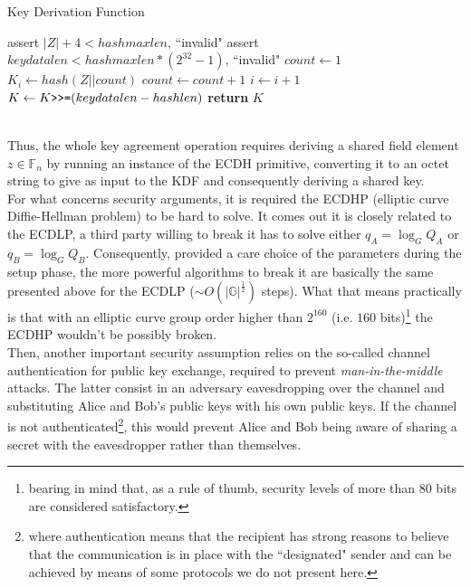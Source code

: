 \begin{algorithm}
	\caption{Key Derivation Function}
	\label{alg:KDF}
	\begin{algorithmic}[1]
		\State assert $|Z| + 4 < hashmaxlen $, ``invalid"
		\State assert $keydatalen < hashmaxlen * (2^{32} -1) $, ``invalid"
		\State $count \gets 1 $  
		\State $K_i \gets hash(Z||count)$
		\State $count \gets count + 1$
		\State $i \gets i + 1$
		\EndFor
		\State $K \gets K \verb|>>=| (keydatalen - hashlen)$ 
		\State \textbf{return} $K$ 
		\EndProcedure
	\end{algorithmic}
\end{algorithm}\\
Thus, the whole key agreement operation requires deriving a shared field element $z \in \mathbb{F}_n$ by running an instance of the ECDH primitive, converting it to an octet string to give as input to the KDF and consequently deriving a shared key.\\
For what concerns security arguments, it is required the ECDHP (elliptic curve Diffie-Hellman problem) to be hard to solve. It comes out it is closely related to the ECDLP, a third party willing to break it has to solve either $q_A = \log_G{Q_A}$ or $q_B = \log_G{Q_B}$. Consequently, provided a care choice of the parameters during the setup phase, the more powerful algorithms to break it are basically the same presented above for the ECDLP ($\sim O(|\mathbb{G}|^{\frac{1}{2}})$ steps). What that means practically is that with an elliptic curve group order higher than $2^{160}$ (i.e. $160$ bits)\footnote{bearing in mind that, as a rule of thumb, security levels of more than 80 bits are considered satisfactory.} the ECDHP wouldn't be possibly broken.\\ 
Then, another important security assumption relies on the so-called channel authentication for public key exchange, required to prevent \textit{man-in-the-middle} attacks. The latter consist in an adversary eavesdropping over the channel and substituting Alice and Bob's public keys with his own public keys. If the channel is not authenticated\footnote{where authentication means that the recipient has strong reasons to believe that the communication is in place with the ``designated" sender and can be achieved by means of some protocols we do not present here.}, this would prevent Alice and Bob being aware of sharing a secret with the eavesdropper rather than themselves.